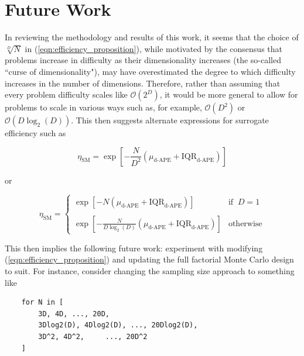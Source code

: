\documentclass[conference]{IEEEtran}
\begin{document}
\section{Future Work}

In reviewing the methodology and results of this work, it seems that the choice of $\sqrt[D]{N}$ in (\ref{eqn:efficiency_proposition}), while motivated by the consensus that problems increase in difficulty as their dimensionality increases (the so-called ``curse of dimensionality"), may have overestimated the degree to which difficulty increases in the number of dimensions. Therefore, rather than assuming that every problem difficulty scales like $\mathcal{O}(2^D)$, it would be more general to allow for problems to scale in various ways such as, for example, $\mathcal{O}(D^2)$ or $\mathcal{O}(D\log_2(D))$. This then suggests alternate expressions for surrogate efficiency such as 

\begin{equation}
	\eta_\textrm{SM} = \exp\left[-\frac{N}{D^2}\left(\mu_\textrm{d-APE} + \textrm{IQR}_\textrm{d-APE}\right)\right]
	\label{eqn:efficiency_proposition_2}
\end{equation}

\noindent or

\begin{equation}
	\eta_\textrm{SM} = \begin{cases}
		\exp\left[-N\left(\mu_\textrm{d-APE} + \textrm{IQR}_\textrm{d-APE}\right)\right] & \textrm{if}\;\;D=1 \\
		{} & {} \\
		\exp\left[-\frac{N}{D\log_2(D)}\left(\mu_\textrm{d-APE} + \textrm{IQR}_\textrm{d-APE}\right)\right] & \textrm{otherwise}
	\end{cases}
	\label{eqn:efficiency_proposition_3}
\end{equation}

\noindent This then implies the following future work: experiment with modifying (\ref{eqn:efficiency_proposition}) and updating the full factorial Monte Carlo design to suit. For instance, consider changing the sampling size approach to something like

\begin{verbatim}
	for N in [
	    3D, 4D, ..., 20D,
	    3Dlog2(D), 4Dlog2(D), ..., 20Dlog2(D),
	    3D^2, 4D^2, 	..., 20D^2
	]
\end{verbatim}



{}

\end{document}
